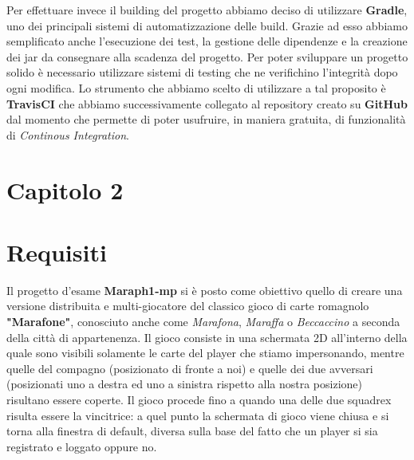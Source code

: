 Per effettuare invece il building del progetto abbiamo deciso di utilizzare \textbf{Gradle}, uno dei principali sistemi di automatizzazione delle build. Grazie ad esso abbiamo semplificato anche l'esecuzione dei test, la gestione delle dipendenze e la creazione dei jar da consegnare alla scadenza del progetto. Per poter sviluppare un progetto solido è necessario utilizzare sistemi di testing che ne verifichino l'integrità dopo ogni modifica. Lo strumento che abbiamo scelto di utilizzare a tal proposito è \textbf{TravisCI} che abbiamo successivamente collegato al repository creato su \textbf{GitHub} dal momento che permette di poter usufruire, in maniera gratuita, di funzionalità di \textit{Continous Integration}.




        \clearpage

	\setcounter{figure}{0}
    \section*{\Huge {\textbf Capitolo 2}\label{chapter2}}
    \section{Requisiti}\label{sec:requirements}
    Il progetto d'esame \textbf{Maraph1-mp} si è posto come obiettivo quello di creare una versione distribuita e multi-giocatore del classico gioco di carte romagnolo \textbf{"Marafone"}, conosciuto anche come \textit{Marafona}, \textit{Maraffa} o \textit{Beccaccino} a seconda della città di appartenenza. Il gioco consiste in una schermata 2D all'interno della quale sono visibili solamente le carte del player che stiamo impersonando, mentre quelle del compagno (posizionato di fronte a noi) e quelle dei due avversari (posizionati uno a destra ed uno a sinistra rispetto alla nostra posizione) risultano essere coperte. Il gioco procede fino a quando una delle due squadrex risulta essere la vincitrice: a quel punto la schermata di gioco viene chiusa e si torna alla finestra di default, diversa sulla base del fatto che un player si sia registrato e loggato oppure no.

